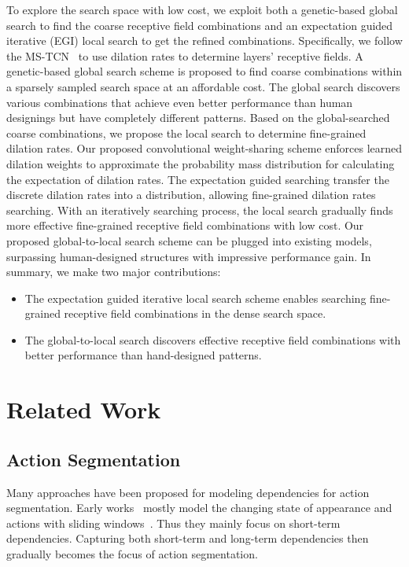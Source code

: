\documentclass[final]{cvpr}
\begin{document}
To explore the search space with low cost,
we exploit both a genetic-based global search to find 
the coarse receptive field combinations 
and an expectation guided iterative (EGI) local search to get 
the refined combinations.
Specifically, we follow the MS-TCN~\cite{farha2019ms}
to use dilation rates to determine layers' receptive fields.  
A genetic-based global search scheme is proposed to find coarse combinations 
within a sparsely sampled search space at an affordable cost.
The global search discovers various combinations that achieve 
even better performance
than human designings but have completely different patterns.
Based on the global-searched coarse combinations,
we propose the local search to determine fine-grained dilation rates.
Our proposed convolutional weight-sharing scheme enforces learned dilation weights to approximate the probability mass distribution for calculating the expectation of dilation rates.
The expectation guided searching transfer the discrete 
dilation rates into a distribution,
allowing fine-grained dilation rates searching.
With an iteratively searching process,
the local search gradually finds more effective fine-grained receptive field
combinations with low cost.
Our proposed global-to-local search scheme can be plugged into existing models, 
surpassing human-designed structures with impressive performance gain.
In summary, we make two major contributions:
\begin{itemize}
  \item The expectation guided iterative local search scheme enables 
    searching fine-grained receptive field combinations 
    in the dense search space.
  \item The global-to-local search discovers effective receptive field
    combinations with better performance than hand-designed patterns.
\end{itemize} 



\section{Related Work}

\subsection{Action Segmentation}
Many approaches have been proposed for modeling dependencies for 
action segmentation.
Early works~\cite{fathi2013modeling,fathi2011understanding,fathi2011learning} 
mostly model the changing state of appearance and actions with sliding 
windows~\cite{rohrbach2012database,karaman2014fast,bhattacharya2014recognition}.
Thus they mainly focus on short-term dependencies.
Capturing both short-term and long-term dependencies then gradually becomes 
the focus of action segmentation.
\end{document}
